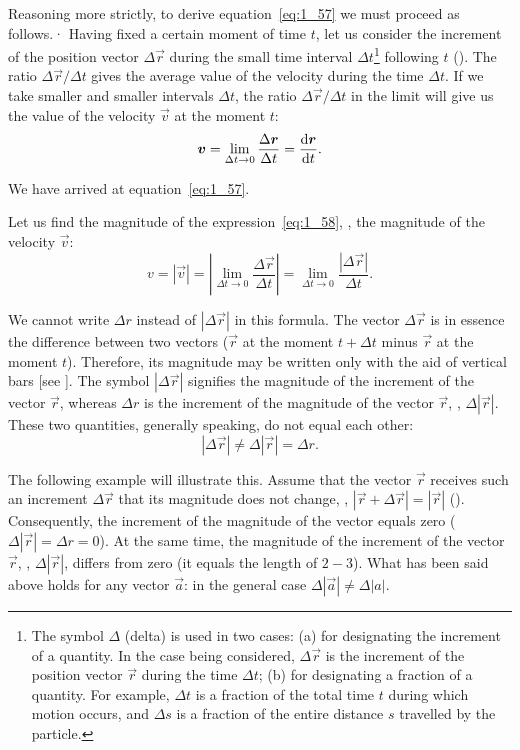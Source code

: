 Reasoning more strictly, to derive equation~\eqref{eq:1_57} we must proceed as follows.· Having fixed a certain moment of time $t$, let us consider the increment of the position vector $\Delta\vec{r}$ during the small time interval $\Delta t$\footnote{The symbol $\Delta$ (delta) is used in two cases: (a) for designating the increment of a quantity. In the case being considered, $\Delta\vec{r}$ is the increment of the position vector $\vec{r}$ during the time $\Delta t$; (b) for designating a fraction of a quantity. For example, $\Delta t$ is a fraction of the total time $t$ during which motion occurs, and $\Delta s$ is a fraction of the entire 	distance $s$ travelled by the particle.} following $t$ (). The ratio $\Delta\vec{r}/\Delta t$ gives the average value of the velocity during the time $\Delta t$. If we take smaller and smaller intervals $\Delta t$, the ratio $\Delta\vec{r}/\Delta t$ in the limit will give us the value of the velocity $\vec{v}$ at the moment $t$:
\begin{equation}\label{eq:1_58}
\boldsymbol{v} = \lim_{\Delta t\to 0} \frac{\Delta\boldsymbol{r}}{\Delta t} = \frac{\mathrm{d}\boldsymbol{r}}{\mathrm{d} t}.
\end{equation}

\noindent
We have arrived at equation~\eqref{eq:1_57}.

Let us find the magnitude of the expression~\eqref{eq:1_58}, \ie, the magnitude of the velocity $\vec{v}$:
\begin{equation}\label{eq:1_59}
v = |\vec{v}| = \left|\lim_{\Delta t\to 0} \frac{\Delta\vec{r}}{\Delta t}\right| = \lim_{\Delta t\to 0} \frac{|\Delta\vec{r}|}{\Delta t}.
\end{equation}

\noindent
We cannot write $\Delta r$ instead of $|\Delta\vec{r}|$ in this formula. The vector $\Delta\vec{r}$ is in essence the difference between two vectors ($\vec{r}$ at the moment $t+\Delta t$ minus $\vec{r}$ at the moment $t$). Therefore, its magnitude may be written only with the aid of vertical
bars [see ]. The symbol $|\Delta\vec{r}|$ signifies the magnitude of the increment of the vector $\vec{r}$, whereas $\Delta r$ is the increment of the magnitude of the vector $\vec{r}$, \ie, $\Delta|\vec{r}|$. These two quantities, generally speaking, do not equal each other:
\begin{equation*}
|\Delta\vec{r}| \neq \Delta|\vec{r}| = \Delta r.
\end{equation*}

\noindent
The following example will illustrate this. Assume that the vector $\vec{r}$ receives such an increment $\Delta\vec{r}$ that its magnitude does not change, \ie, $|\vec{r}+\Delta\vec{r}|=|\vec{r}|$ (). Consequently, the increment of the magnitude of the vector equals zero ($\Delta|\vec{r}| = \Delta r = 0$). At the same time, the magnitude of the increment of the vector $\vec{r}$, \ie, $\Delta|\vec{r}|$, differs from zero (it equals the length of $2-3$). What has been said above holds for any vector $\vec{a}$: in the general case $\Delta|\vec{a}|\neq\Delta|a|$.

